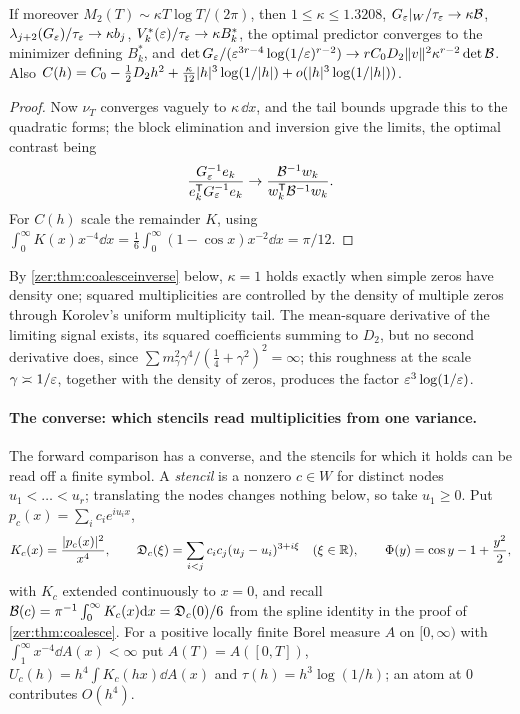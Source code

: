 \begin{proposition}\label{zer:prop:kappa}
If moreover $M_2(T)\sim\kappa T\log T/(2\pi)$, then $1\le\kappa\le1.3208$,
$G_\varepsilon|_W/\tau_\varepsilon\to\kappa\mathcal B$,
$\lambda_{j+2}(G_\varepsilon)/\tau_\varepsilon\to\kappa b_j$, $V_k^*(\varepsilon)/\tau_\varepsilon\to\kappa B_k^*$, the optimal predictor
converges to the minimizer defining $B_k^*$, and
$\det G_\varepsilon/(\varepsilon^{3r-4}\log(1/\varepsilon)^{r-2})\to rC_0D_2\lVert v\rVert^2\kappa^{r-2}\det\mathcal B$. Also
$C(h)=C_0-\tfrac12D_2h^2+\tfrac\kappa{12}\lvert h\rvert^3\log(1/\lvert h\rvert)+o(\lvert h\rvert^3\log(1/\lvert h\rvert))$.
\end{proposition}
\begin{proof}
Now $\nu_T$ converges vaguely to $\kappa\,\dd x$, and the tail bounds upgrade this to the quadratic
forms; the block elimination and inversion give the limits, the optimal contrast being
\[
 \frac{G_\varepsilon^{-1}e_k}{e_k^{\mathsf T}G_\varepsilon^{-1}e_k}\to\frac{\mathcal B^{-1}w_k}{w_k^{\mathsf T}\mathcal B^{-1}w_k}.
\]
For $C(h)$ scale the remainder $K$, using
$\int_0^\infty K(x)x^{-4}\dd x=\tfrac16\int_0^\infty(1-\cos x)x^{-2}\dd x=\pi/12$.
\end{proof}

By \cref{zer:thm:coalesceinverse} below, $\kappa=1$ holds exactly when simple zeros have density one;
squared multiplicities are controlled by the density of multiple zeros through Korolev's uniform
multiplicity tail. The mean-square derivative
of the limiting signal exists, its squared coefficients summing to $D_2$, but no second
derivative does, since $\sum m_\gamma^2\gamma^4/(\tfrac14+\gamma^2)^2=\infty$; this roughness at the scale
$\gamma\asymp1/\varepsilon$, together with the density of zeros, produces the factor $\varepsilon^3\log(1/\varepsilon)$.

\paragraph{The converse: which stencils read multiplicities from one variance.}
The forward comparison has a converse, and the stencils for which it holds can be read off a finite
symbol. A \emph{stencil} is a nonzero $c\in W$ for distinct nodes $u_1<\dots<u_r$; translating the
nodes changes nothing below, so take $u_1\ge0$. Put $p_c(x)=\sum_ic_ie^{iu_ix}$,
\[
 K_c(x)=\frac{\lvert p_c(x)\rvert^2}{x^4},\qquad
 \mathfrak{D}_c(\xi)=\sum_{i<j}c_ic_j(u_j-u_i)^{3+i\xi}\quad(\xi\in\mathbb{R}),\qquad
 \Phi(y)=\cos y-1+\frac{y^2}2 ,
\]
with $K_c$ extended continuously to $x=0$, and recall
$\mathcal B(c)=\pi^{-1}\int_0^\infty K_c(x)\mathrm{d} x=\mathfrak{D}_c(0)/6$ from the spline identity in the proof of
\cref{zer:thm:coalesce}. For a positive locally finite Borel measure $A$ on $[0,\infty)$ with
$\int_1^\infty x^{-4}\dd A(x)<\infty$ put $A(T)=A([0,T])$, $U_c(h)=h^4\int K_c(hx)\dd A(x)$ and
$\tau(h)=h^3\log(1/h)$; an atom at $0$ contributes $O(h^4)$.

